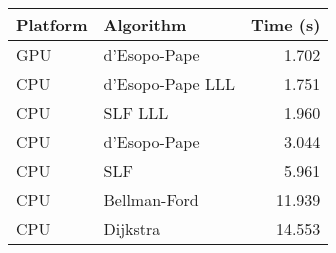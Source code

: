 \begin{tabular}{llr}
  \hline
  Platform & Algorithm & Time (s) \\
  \hline
  GPU & d'Esopo-Pape & 1.702 \\
  CPU & d'Esopo-Pape LLL & 1.751 \\
  CPU & SLF LLL & 1.960 \\
  CPU & d'Esopo-Pape & 3.044 \\
  CPU & SLF & 5.961 \\
  CPU & Bellman-Ford & 11.939 \\
  CPU & Dijkstra & 14.553 \\
  \hline
\end{tabular}
